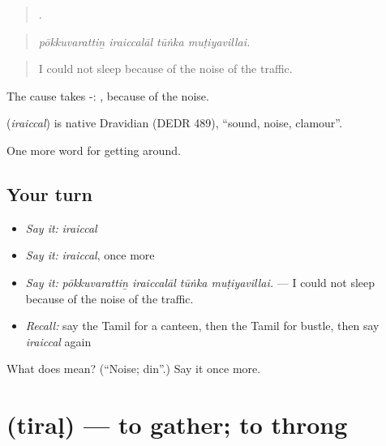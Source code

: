 \begin{quote}
   .
\end{quote}

\begin{quote}
\emph{pōkkuvarattiṉ iraiccalāl tūṅka muṭiyavillai.}
\end{quote}

\begin{quote}
I could not sleep because of the noise of the traffic.
\end{quote}

The cause takes -: , because of the noise.

\begin{cousinweb}
\textbf{} (\emph{iraiccal}) is native Dravidian (DEDR 489), \textquotedblleft{}sound, noise, clamour\textquotedblright{}.
\end{cousinweb}

\begin{grammarlens}[title={What you've built}]
One more word for getting around.
\end{grammarlens}

\subsection*{Your turn}
\begin{itemize}
\raggedright
  \item \emph{Say it:} \emph{iraiccal}
  \item \emph{Say it:} \emph{iraiccal}, once more
  \item \emph{Say it:} \emph{pōkkuvarattiṉ iraiccalāl tūṅka muṭiyavillai.} — I could not sleep because of the noise of the traffic.
  \item \emph{Recall:} say the Tamil for a canteen, then the Tamil for bustle, then say \emph{iraiccal} again
\end{itemize}

\begin{tcolorbox}[breakable,colback=teal!4,colframe=teal!35!black,title={Before you move on}]
What does  mean? (\textquotedblleft{}Noise; din\textquotedblright{}.) Say it once more.
\end{tcolorbox}
\section[\texorpdfstring{\ta{திரள்} (tiraḷ)}{திரள் (tiraḷ)}]{ (tiraḷ) — to gather; to throng}

